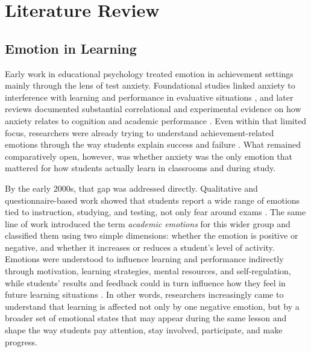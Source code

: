 \chapter{Literature Review}\label{chap:background}


\section{Emotion in Learning}\label{sec:emotion_in_learning}

Early work in educational psychology treated emotion in achievement settings mainly through the lens of test anxiety. Foundational studies linked anxiety to interference with learning and performance in evaluative situations \cite{mandler1952anxiety}, and later reviews documented substantial correlational and experimental evidence on how anxiety relates to cognition and academic performance \cite{hembree1988testanxiety,zeidner1998testanxiety}. Even within that limited focus, researchers were already trying to understand achievement-related emotions through the way students explain success and failure \cite{weiner1985attributional}. What remained comparatively open, however, was whether anxiety was the only emotion that mattered for how students actually learn in classrooms and during study.

By the early 2000s, that gap was addressed directly. Qualitative and questionnaire-based work showed that students report a wide range of emotions tied to instruction, studying, and testing, not only fear around exams \cite{pekrun_academic_nodate}. The same line of work introduced the term \emph{academic emotions} for this wider group and classified them using two simple dimensions: whether the emotion is positive or negative, and whether it increases or reduces a student's level of activity. Emotions were understood to influence learning and performance indirectly through motivation, learning strategies, mental resources, and self-regulation, while students' results and feedback could in turn influence how they feel in future learning situations \cite{pekrun_academic_nodate}. In other words, researchers increasingly came to understand that learning is affected not only by one negative emotion, but by a broader set of emotional states that may appear during the same lesson and shape the way students pay attention, stay involved, participate, and make progress.

